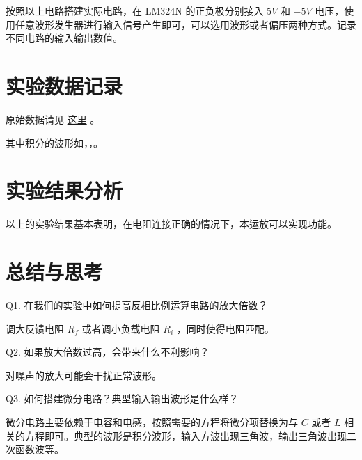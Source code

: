 \documentclass[lang=cn,11pt,a4paper,cite=authoryear]{elegantpaper}
\begin{document}








按照以上电路搭建实际电路，在 LM324N 的正负极分别接入 \(5 V\) 和 \(-5 V\) 电压，使用任意波形发生器进行输入信号产生即可，可以选用波形或者偏压两种方式。记录不同电路的输入输出数值。

\section{实验数据记录}

原始数据请见 \href{https://github.com/PannenetsF/Mirco-Electronic-Device-Experiment/tree/main/homework/hw14}{这里} 。

其中积分的波形如，，。




\section{实验结果分析}

以上的实验结果基本表明，在电阻连接正确的情况下，本运放可以实现功能。

\section{总结与思考}


Q1. 在我们的实验中如何提高反相比例运算电路的放大倍数？

调大反馈电阻 \(R_f\) 或者调小负载电阻 \(R_i\) ，同时使得电阻匹配。

Q2. 如果放大倍数过高，会带来什么不利影响？

对噪声的放大可能会干扰正常波形。

Q3. 如何搭建微分电路？典型输入输出波形是什么样？

微分电路主要依赖于电容和电感，按照需要的方程将微分项替换为与 \(C\) 或者 \(L\) 相关的方程即可。典型的波形是积分波形，输入方波出现三角波，输出三角波出现二次函数波等。


\end{document}
